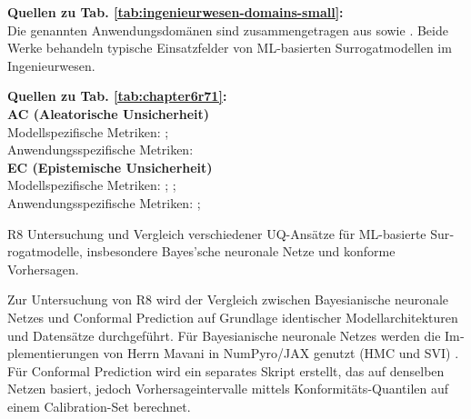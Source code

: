 \begin{otherlanguage}{ngerman}
{\begin{minipage}[t]{\textwidth}
\scriptsize
\textbf{Quellen zu Tab. \ref{tab:ingenieurwesen-domains-small}:}\\[0.5em]
Die genannten Anwendungsdomänen sind zusammengetragen aus \parencite{Gawlikowski2023} sowie \parencite{Ulmer2023}. Beide Werke behandeln typische Einsatzfelder von ML-basierten Surrogatmodellen im Ingenieurwesen. 
\end{minipage}%
\vspace{0.125em}
\begin{minipage}[t]{\textwidth}
\scriptsize
\textbf{Quellen zu Tab. \ref{tab:chapter6r71}:}\\[0.5em]
\textbf{AC (Aleatorische Unsicherheit)}\\
\quad Modellspezifische Metriken: \parencite[S.~224–226]{bishop2006pattern}; \parencite[Kap.~2]{rasmussen2006gaussian} \\
\quad Anwendungsspezifische Metriken: \parencite[S.~40–42]{bishop2006pattern} \\[0.5em]

\textbf{EC (Epistemische Unsicherheit)}\\
\quad Modellspezifische Metriken: \parencite[S.~40–42]{gal2016uncertainty}; \parencite{blundell2015weight}; \parencite{sensoy2018evidential} \\
\quad Anwendungsspezifische Metriken: \parencite[S.~233–235]{bishop2006pattern}; \parencite{ovadia2019can}
\end{minipage}%
}


\pagebreak


R8 Untersuchung und Vergleich verschiedener UQ-Ansätze für ML-basierte Surrogatmodelle, insbesondere Bayes'sche neuronale Netze und konforme Vorhersagen.


Zur Untersuchung von R8 wird der Vergleich zwischen \gls{Bayesianische neuronale Netze}s und \gls{Conformal Prediction} auf Grundlage identischer Modellarchitekturen und Datensätze durchgeführt. Für \gls{Bayesianische neuronale Netze}s werden die Implementierungen von Herrn Mavani in NumPyro/JAX genutzt (HMC und SVI) \parencite{nmavani2025}. Für \gls{Conformal Prediction} wird ein separates Skript erstellt, das auf denselben Netzen basiert, jedoch Vorhersageintervalle mittels Konformitäts-Quantilen auf einem Calibration-Set berechnet.


\end{otherlanguage}
